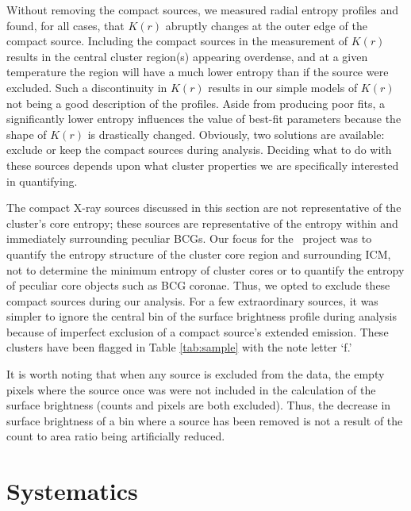 \documentclass[12pt,preprint]{aastex}
\begin{document}
Without removing the compact sources, we measured radial entropy
profiles and found, for all cases, that $K(r)$ abruptly changes at the
outer edge of the compact source. Including the compact sources in the
measurement of $K(r)$ results in the central cluster region(s)
appearing overdense, and at a given temperature the region will have a
much lower entropy than if the source were excluded. Such a
discontinuity in $K(r)$ results in our simple models of $K(r)$ not
being a good description of the profiles. Aside from producing poor
fits, a significantly lower entropy influences the value of best-fit
parameters because the shape of $K(r)$ is drastically
changed. Obviously, two solutions are available: exclude or keep the
compact sources during analysis.  Deciding what to do with these
sources depends upon what cluster properties we are specifically
interested in quantifying.

The compact X-ray sources discussed in this section are not
representative of the cluster's core entropy; these sources are
representative of the entropy within and immediately surrounding
peculiar BCGs. Our focus for the \accept\ project was to quantify the
entropy structure of the cluster core region and surrounding ICM, not
to determine the minimum entropy of cluster cores or to quantify the
entropy of peculiar core objects such as BCG coronae. Thus, we opted
to exclude these compact sources during our analysis. For a few
extraordinary sources, it was simpler to ignore the central bin of the
surface brightness profile during analysis because of imperfect
exclusion of a compact source's extended emission. These clusters have
been flagged in Table \ref{tab:sample} with the note letter `f.'

It is worth noting that when any source is excluded from the data, the
empty pixels where the source once was were not included in the
calculation of the surface brightness (counts and pixels are both
excluded). Thus, the decrease in surface brightness of a bin where a
source has been removed is not a result of the count to area ratio
being artificially reduced.

\section{Systematics}
\label{sec:sys}
\end{document}

